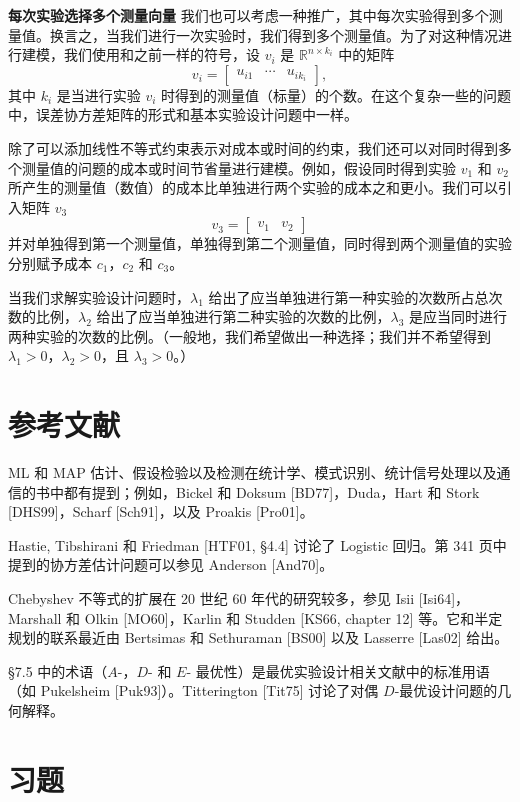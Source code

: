 \documentclass[UTF8, 12pt, fontset=fandol, oneside]{ctexart}
\begin{document}
\noindent\textbf{每次实验选择多个测量向量}\quad
我们也可以考虑一种推广，其中每次实验得到多个测量值。换言之，当我们进行一次实验时，我们得到多个测量值。为了对这种情况进行建模，我们使用和之前一样的符号，设 $v_i$ 是 $\mathbb{R}^{n\times k_i}$ 中的矩阵
\[
v_i=\begin{bmatrix}u_{i1}&\cdots&u_{ik_i}\end{bmatrix},
\]
其中 $k_i$ 是当进行实验 $v_i$ 时得到的测量值（标量）的个数。在这个复杂一些的问题中，误差协方差矩阵的形式和基本实验设计问题中一样。

除了可以添加线性不等式约束表示对成本或时间的约束，我们还可以对同时得到多个测量值的问题的成本或时间节省量进行建模。例如，假设同时得到实验 $v_1$ 和 $v_2$ 所产生的测量值（数值）的成本比单独进行两个实验的成本之和更小。我们可以引入矩阵 $v_3$
\[
v_3=\begin{bmatrix}v_1&v_2\end{bmatrix}
\]
并对单独得到第一个测量值，单独得到第二个测量值，同时得到两个测量值的实验分别赋予成本 $c_1$，$c_2$ 和 $c_3$。

当我们求解实验设计问题时，$\lambda_1$ 给出了应当单独进行第一种实验的次数所占总次数的比例，$\lambda_2$ 给出了应当单独进行第二种实验的次数的比例，$\lambda_3$ 是应当同时进行两种实验的次数的比例。（一般地，我们希望做出一种选择；我们并不希望得到 $\lambda_1>0$，$\lambda_2>0$，且 $\lambda_3>0$。）

\section*{参考文献}

ML 和 MAP 估计、假设检验以及检测在统计学、模式识别、统计信号处理以及通信的书中都有提到；例如，Bickel 和 Doksum [BD77]，Duda，Hart 和 Stork [DHS99]，Scharf [Sch91]，以及 Proakis [Pro01]。

Hastie, Tibshirani 和 Friedman [HTF01, \S4.4] 讨论了 Logistic 回归。第 341 页中提到的协方差估计问题可以参见 Anderson [And70]。

Chebyshev 不等式的扩展在 20 世纪 60 年代的研究较多，参见 Isii [Isi64]，Marshall 和 Olkin [MO60]，Karlin 和 Studden [KS66, chapter 12] 等。它和半定规划的联系最近由 Bertsimas 和 Sethuraman [BS00] 以及 Lasserre [Las02] 给出。

\S7.5 中的术语（$A$-，$D$- 和 $E$- 最优性）是最优实验设计相关文献中的标准用语（如 Pukelsheim [Puk93]）。Titterington [Tit75] 讨论了对偶 $D$-最优设计问题的几何解释。

\section*{习题}
\end{document}
